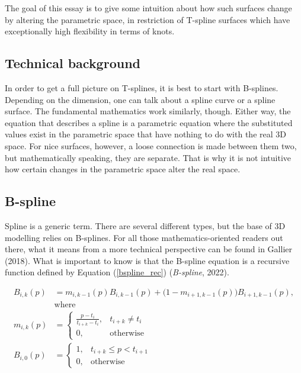 \documentclass{article}
\begin{document}
\vspace{6pt}

The goal of this essay is to give some intuition about how such surfaces change by altering the parametric space, in restriction of T-spline surfaces which have exceptionally high flexibility in terms of knots.

\vspace{12pt}

\begin{large}
\section{Technical background}
\label{sec:tech}
\end{large}

\vspace{12pt}

In order to get a full picture on T-splines, it is best to start with B-splines. Depending on the dimension, one can talk about a spline curve or a spline surface. The fundamental mathematics work similarly, though. Either way, the equation that describes a spline is a parametric equation where the substituted values exist in the parametric space that have nothing to do with the real 3D space. For nice surfaces, however, a loose connection is made between them two, but mathematically speaking, they are separate. That is why it is not intuitive how certain changes in the parametric space alter the real space.

\subsection{B-spline}

\vspace{6pt}
Spline is a generic term. There are several different types, but the base of 3D modelling relies on B-splines. For all those mathematics-oriented readers out there, what it means from a more technical perspective can be found in Gallier (2018). What is important to know is that the B-spline equation is a recursive function defined by Equation (\ref{bspline_rec}) (\emph{B-spline}, 2022).

\begin{equation}
\begin{split}
B_{i,k}(p) & = m_{i,k-1}(p) B_{i,k-1}(p) + \big(1 - m_{i+1,k-1}(p)\big) B_{i+1,k-1}(p), \\
& \text{where} \\
m_{i,k}(p) & =
    \begin{cases}
      \frac{p-t_i}{t_{i+k}-t_i}, & t_{i+k} \neq t_i \\
      0, & \text{otherwise}
    \end{cases}
\\
B_{i,0}(p) & =
    \begin{cases}
      1, & t_{i+k} \leq p < t_{i+1} \\
      0, & \text{otherwise}
    \end{cases}
\end{split}
\label{bspline_rec}
\end{equation}
\end{document}
